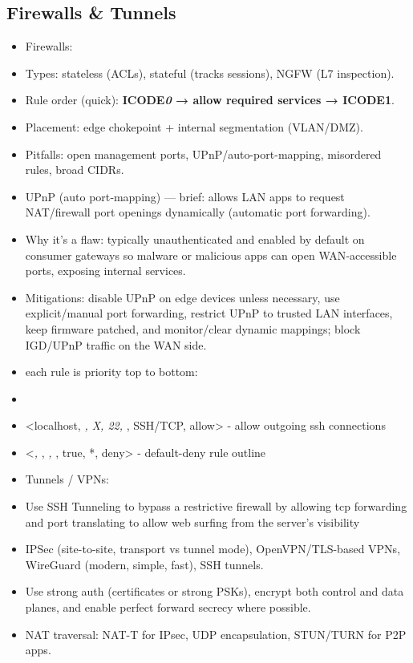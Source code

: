 \documentclass{article}
\begin{document}
\subsection{Firewalls \& Tunnels}
\begin{itemize}
  \item Firewalls:
  \item Types: stateless (ACLs), stateful (tracks sessions), NGFW (L7 inspection).
  \item Rule order (quick): \textbf{ICODE\textit{0} → allow required services → \textbf{ICODE}1}.
  \item Placement: edge chokepoint + internal segmentation (VLAN/DMZ).
  \item Pitfalls: open management ports, UPnP/auto-port-mapping, misordered rules, broad CIDRs.
  \item UPnP (auto port‑mapping) — brief: allows LAN apps to request NAT/firewall port openings dynamically (automatic port forwarding).
  \item Why it's a flaw: typically unauthenticated and enabled by default on consumer gateways so malware or malicious apps can open WAN‑accessible ports, exposing internal services.
  \item Mitigations: disable UPnP on edge devices unless necessary, use explicit/manual port forwarding, restrict UPnP to trusted LAN interfaces, keep firmware patched, and monitor/clear dynamic mappings; block IGD/UPnP traffic on the WAN side.
  \item each rule is priority top to bottom:
  \item <sourceIP, sourcePort, destinationIP, destinationPort, condition, protocol, decision>
  \item <localhost, \textit{, X, 22, }, SSH/TCP, allow> - allow outgoing ssh connections
  \item <\textit{, }, \textit{, }, true, *, deny> - default-deny rule outline
  \item Tunnels / VPNs:
  \item Use SSH Tunneling to bypass a restrictive firewall by allowing tcp forwarding and port translating to allow web surfing from the server's visibility
  \item IPSec (site-to-site, transport vs tunnel mode), OpenVPN/TLS-based VPNs, WireGuard (modern, simple, fast), SSH tunnels.
  \item Use strong auth (certificates or strong PSKs), encrypt both control and data planes, and enable perfect forward secrecy where possible.
  \item NAT traversal: NAT-T for IPsec, UDP encapsulation, STUN/TURN for P2P apps.
\end{itemize}
\end{document}
